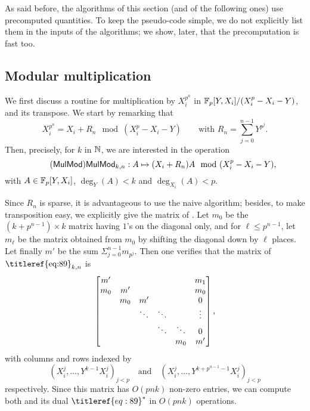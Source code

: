 As said before, the algorithms of this section (and of the following
ones) use precomputed quantities. To keep the pseudo-code simple, we
do not explicitly list them in the inputs of the algorithms;
we show, later, that the precomputation is fast too.


\subsection{Modular multiplication}
\label{ssec:mulmod}

We first discuss a routine for multiplication by $X_i^{p^n}$
in $\mathbb{F}_p[Y,X_i]/(X_i^p-X_i-Y)$, and its transpose. We start by
remarking that 
\begin{equation}
  \label{eq:Kn}
  X_i^{p^n}=X_i+R_n \mod (X_i^p-X_i-Y) \qquad\text{with }
  R_n = \sum_{j=0}^{n-1} Y^{p^j}
  \text{.}
\end{equation}
Then, precisely, for $k$ in $\mathbb{N}$, we are interested in the operation
\begin{equation}
  \tag{\alg{MulMod}}
  \label{eq:89}
  \text{\alg{MulMod}}_{k,n}: A \mapsto (X_i+R_n)A \mod (X_i^p-X_i-Y)
  \text{,}  
\end{equation}
with $A\in \mathbb{F}_p[Y,X_i]$, $\deg_Y(A) < k$ and $\deg_{X_i}(A) <p$.

Since $R_n$ is sparse, it is advantageous to use the naive algorithm;
besides, to make transposition easy, we explicitly give the matrix of
. Let $m_0$ be the
$(k+p^{n-1})\times k$ matrix having $1$'s on the diagonal only, and
for $\ell \le p^{n-1}$, let $m_\ell$ be the matrix obtained from $m_0$
by shifting the diagonal down by $\ell$ places. Let finally $m'$ be
the sum $\Sigma_{j=0}^{n-1} m_{p^j}$. Then one verifies that the
matrix of $\text{\titleref{eq:89}}_{k,n}$ is
\begin{equation}
  \pdfmctwo{Detailed last column of the matrix.}
  \begin{bmatrix}
    m'  &     &        &        &        & m_1 \\
    m_0 & m'  &        &        &        & m_0 \\
        & m_0 & m'     &        &        & 0   \\
        &     & \ddots & \ddots &        & \vdots\\
        &     &        & \ddots & \ddots & 0\\
        &     &        &        & m_0    & m'
  \end{bmatrix}
  \text{,}
\end{equation}
with columns and rows indexed by 
\begin{equation}
  \label{eq:90}
  (X_i^j,\dots,Y^{k-1}X_i^j)_{j < p}
  \quad\text{and}\quad
  (X_i^j,\dots,Y^{k+p^{n-1}-1}X_i^j)_{j < p}  
\end{equation}
respectively.  Since this matrix has $O(pnk)$ non-zero entries, we can
compute both  and its dual $\dual{\titleref{eq:89}}$
in $O(pnk)$ operations.


